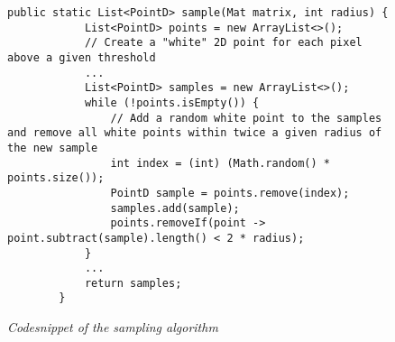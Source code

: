 \lstset{language=Java}
\begin{figure}
    \begin{lstlisting}[frame=single]
        public static List<PointD> sample(Mat matrix, int radius) {
            List<PointD> points = new ArrayList<>();
            // Create a "white" 2D point for each pixel above a given threshold
            ...
            List<PointD> samples = new ArrayList<>();
            while (!points.isEmpty()) {
                // Add a random white point to the samples and remove all white points within twice a given radius of the new sample
                int index = (int) (Math.random() * points.size());
                PointD sample = points.remove(index);
                samples.add(sample);
                points.removeIf(point -> point.subtract(sample).length() < 2 * radius);
            }
            ...
            return samples;
        }
    \end{lstlisting}
    \caption{\textit{Codesnippet of the sampling algorithm}}
    \label{fig8}
\end{figure}